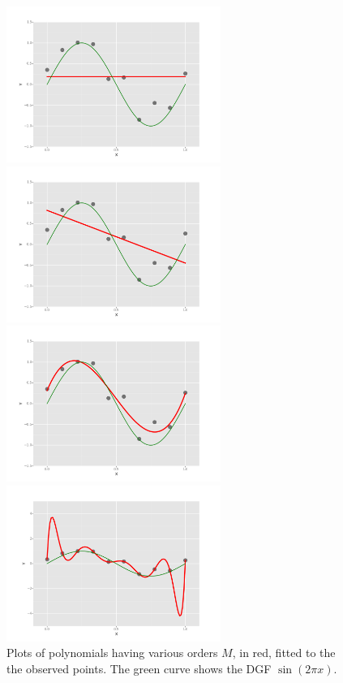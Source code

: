 \documentclass[10pt]{article}
\begin{document}
\begin{figure}[ht]
	\centering
	\begin{minipage}[b]{.24\linewidth}
		\includegraphics[width=1\linewidth, height=2in]{Meq0.png}
		\caption*{$M=0$}
	\end{minipage}
	\begin{minipage}[b]{.24\linewidth}
		\includegraphics[width=1\linewidth, height=2in]{Meq1.png}
		\caption*{$M=1$}
	\end{minipage}
	\begin{minipage}[b]{.24\linewidth}
		\includegraphics[width=1\linewidth, height=2in]{Meq3.png}
		\caption*{$M=3$}
	\end{minipage}
	\begin{minipage}[b]{.24\linewidth}
		\includegraphics[width=1\linewidth, height=2in]{Meq9.png}
		\caption*{$M=9$}
	\end{minipage}
	\caption{Plots of polynomials having various orders $M$, in red, fitted to the the observed points. The green curve shows the DGF $\sin(2\pi x)$.}
\end{figure}
\end{document}
